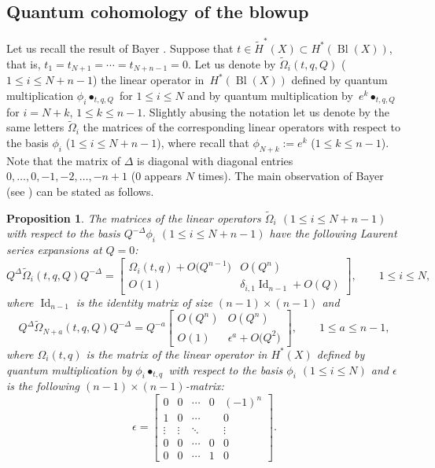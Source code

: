 \documentclass[pdftex]{sigma}
\numberwithin{equation}{section}
\newtheorem{Proposition}[Theorem]{Proposition}
\begin{document}
\subsection{Quantum cohomology of the blowup}
Let us recall the result of Bayer \cite{Ba}. Suppose that $t\in
\widetilde{H}^*(X)\subset H^*(\operatorname{Bl}(X))$, that is,
$t_1=t_{N+1}=\cdots=t_{N+n-1}=0$. Let us denote by
$\widetilde{\Omega}_i(t,q,Q)$ ($1\leq i\leq N+n-1$) the linear operator in~$H^*(\operatorname{Bl}(X))$ defined by quantum multiplication
$\phi_i\bullet_{t,q,Q}$ for $1\leq i\leq N$ and by quantum
multiplication by~$e^k\bullet_{t,q,Q}$ for $i=N+k$, $1\leq k\leq n-1$.
Slightly
abusing the notation let us denote by the same letters
$\widetilde{\Omega}_i$ the matrices of the corresponding linear
operators with respect to the basis $\phi_i$ ($1\leq
i\leq N+n-1$), where recall that $\phi_{N+k}:=e^k$ ($1\leq k\leq n-1$). Note that the matrix of
$\Delta$ is diagonal with diagonal entries $0,\dots, 0, -1, -2,\dots,
-n+1 $ ($0$ appears $N$ times). The main observation of Bayer (see \cite[Section 3.4]{Ba}) can be stated as follows.
\begin{Proposition}\label{prop:Ba}
The matrices of the linear operators $\widetilde{\Omega}_i$ $(1\leq
i\leq N+n-1)$ with respect to the basis $Q^{-\Delta} \phi_i$ $(1\leq
i\leq N+n-1)$ have the
following Laurent series expansions at $Q=0$:
\begin{equation}\label{qm:phii}
Q^{\Delta} \widetilde{\Omega}_i(t,q,Q) Q^{-\Delta} =
\begin{bmatrix}
\Omega_i(t,q) +O\big(Q^{n-1}\big) & O(Q^n) \\
O(1) & \delta_{i,1} \operatorname{Id}_{n-1} + O(Q)
\end{bmatrix}
,\qquad 1\leq i\leq N,
\end{equation}
where $\operatorname{Id}_{n-1}$ is the identity matrix of size
$(n-1)\times (n-1)$ and
\begin{equation}\label{qm:e^k}
Q^\Delta \widetilde{\Omega}_{N+a}(t,q,Q) Q^{-\Delta} =
Q^{-a}
\begin{bmatrix}
O(Q^n)& O(Q^n) \\
O(1) & \epsilon^a + O\big(Q^2\big)
\end{bmatrix}
,\qquad 1\leq a\leq n-1,
\end{equation}
where $\Omega_i(t,q)$ is the matrix of the linear operator in $H^*(X)$
defined by quantum multiplication by $\phi_i\bullet_{t,q}$ with
respect to the basis $\phi_i$ $(1\leq i\leq N)$ and $\epsilon$ is the
following $(n-1)\times (n-1)$-matrix:
\[
\epsilon =
\begin{bmatrix}
0 & 0 & \cdots & 0 & (-1)^n \\
1 & 0 & \cdots & & 0 \\
 \vdots & \vdots & \ddots & & \vdots \\
0 & 0 & \cdots & 0 & 0 \\
0 & 0 & \cdots & 1 & 0
\end{bmatrix}.
\]
\end{Proposition}
\end{document}
